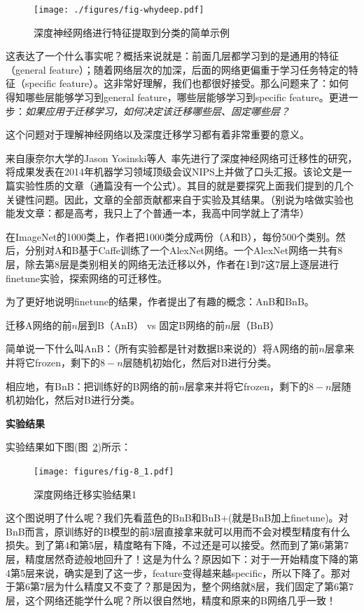 \begin{figure}[htbp]
	\centering
	\texttt{[image: ./figures/fig-whydeep.pdf]}
	\caption{深度神经网络进行特征提取到分类的简单示例}
	\label{fig-whydeep}
\end{figure}

这表达了一个什么事实呢？概括来说就是：前面几层都学习到的是通用的特征（general feature）；随着网络层次的加深，后面的网络更偏重于学习任务特定的特征（specific feature）。这非常好理解，我们也都很好接受。那么问题来了：如何得知哪些层能够学习到general feature，哪些层能够学习到specific feature。更进一步：\textit{如果应用于迁移学习，如何决定该迁移哪些层、固定哪些层？}

这个问题对于理解神经网络以及深度迁移学习都有着非常重要的意义。

来自康奈尔大学的Jason Yosinski等人~\cite{yosinski2014transferable}率先进行了深度神经网络可迁移性的研究，将成果发表在2014年机器学习领域顶级会议NIPS上并做了口头汇报。该论文是一篇实验性质的文章（通篇没有一个公式）。其目的就是要探究上面我们提到的几个关键性问题。因此，文章的全部贡献都来自于实验及其结果。（别说为啥做实验也能发文章：都是高考，我只上了个普通一本，我高中同学就上了清华）

在ImageNet的1000类上，作者把1000类分成两份（A和B），每份500个类别。然后，分别对A和B基于Caffe训练了一个AlexNet网络。一个AlexNet网络一共有8层，除去第8层是类别相关的网络无法迁移以外，作者在1到7这7层上逐层进行finetune实验，探索网络的可迁移性。

为了更好地说明finetune的结果，作者提出了有趣的概念：AnB和BnB。

迁移A网络的前$n$层到B（AnB） vs 固定B网络的前$n$层（BnB）

简单说一下什么叫AnB：（所有实验都是针对数据B来说的）将A网络的前$n$层拿来并将它frozen，剩下的$8-n$层随机初始化，然后对B进行分类。

相应地，有BnB：把训练好的B网络的前$n$层拿来并将它frozen，剩下的$8-n$层随机初始化，然后对B进行分类。

\textbf{实验结果}

实验结果如下图(图~\ref{fig-8-2})所示：

\begin{figure}[htbp]
	\centering
	\texttt{[image: figures/fig-8\_1.pdf]}
	\caption{深度网络迁移实验结果1}
	\label{fig-8-2}
\end{figure}

这个图说明了什么呢？我们先看蓝色的BnB和BnB+(就是BnB加上finetune)。对BnB而言，原训练好的B模型的前3层直接拿来就可以用而不会对模型精度有什么损失。到了第4和第5层，精度略有下降，不过还是可以接受。然而到了第6第第7层，精度居然奇迹般地回升了！这是为什么？原因如下：对于一开始精度下降的第4第5层来说，确实是到了这一步，feature变得越来越specific，所以下降了。那对于第6第7层为什么精度又不变了？那是因为，整个网络就8层，我们固定了第6第7层，这个网络还能学什么呢？所以很自然地，精度和原来的B网络几乎一致！

